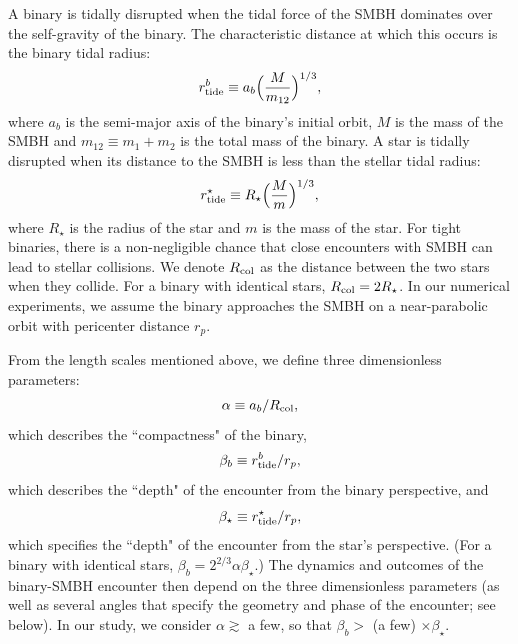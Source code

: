 \documentclass[twocolumn]{aastex631}
\begin{document}
A binary is tidally disrupted when the tidal force of the SMBH dominates over the self-gravity of the binary. 
The characteristic distance at which this occurs is the binary tidal radius:
\begin{equation}
r_{\rm tide}^{b} \equiv a_b \Bigl(\frac{M}{m_{12}} \Bigr)^{1/3},
\label{eq:r_tide^b}
\end{equation}
where $a_b$ is the semi-major axis of the binary's initial orbit, $M$ is the mass of the SMBH and $m_{12}\equiv m_1+m_2$ is the total mass of the binary.
A star is tidally disrupted when its distance to the SMBH is less than the stellar tidal radius:
\begin{equation}
r_{\rm tide}^{\star} \equiv R_\star \Bigl(\frac{M}{m} \Bigr)^{1/3},
\label{eq:r_tide^s}
\end{equation}
where $R_\star$ is the radius of the star and $m$ is the mass of the star.
For tight binaries, there is a non-negligible chance that close encounters with SMBH can lead to stellar collisions.
We denote $R_{\rm col}$ as the distance between the two stars when they collide. 
For a binary with identical stars, $R_{\rm col} = 2R_\star$.
In our numerical experiments, we assume the binary approaches the SMBH on a near-parabolic orbit with pericenter distance $r_p$.

From the length scales mentioned above, we define three dimensionless parameters:
\begin{equation}
    \alpha \equiv a_b/R_{\rm col},
    \label{eq:alpha}
\end{equation}
which describes the ``compactness" of the binary,
\begin{equation}
    \beta_b \equiv r_{\rm tide}^b/r_p,
    \label{eq:beta}
\end{equation}
which describes the ``depth" of the encounter from the binary perspective, and
\begin{equation}
    \beta_\star \equiv r_{\rm tide}^\star/r_p,
    \label{eq:beta_s}
\end{equation}
which specifies the ``depth" of the encounter from the star's perspective.
(For a binary with identical stars, $\beta_b=2^{2/3}\alpha\beta_\star$.)
The dynamics and outcomes of the binary-SMBH encounter then depend on the three dimensionless parameters
(as well as several angles that specify the geometry and phase of the encounter; see below).
In our study, we consider $\alpha \gtrsim$ a few, so that $\beta_b > $ (a few) $\times \beta_\star$.
\end{document}
